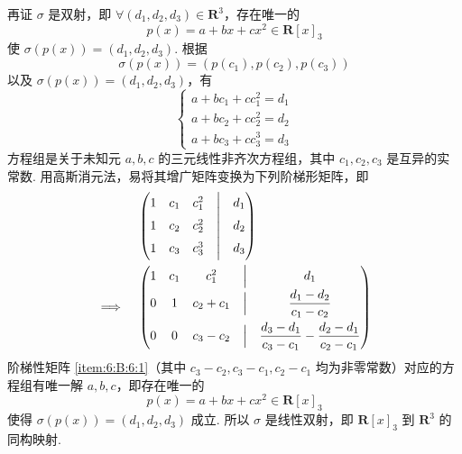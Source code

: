 \begin{enumerate}
          再证 $ \sigma $ 是双射，即 $ \forall (d_1, d_2, d_3) \in \mathbf{R}^3 $，存在唯一的
          \[ p(x) = a + bx + cx^2 \in \mathbf{R}[x]_3 \]
          使 $ \sigma(p(x)) = (d_1, d_2, d_3) $. 根据
          \[ \sigma(p(x)) = (p(c_1), p(c_2), p(c_3)) \]
          以及 $ \sigma(p(x)) = (d_1, d_2, d_3) $，有
          \[ \begin{cases}
                  a + bc_1 + cc_1^2 = d_1 \\
                  a + bc_2 + cc_2^2 = d_2 \\
                  a + bc_3 + cc_3^3 = d_3
              \end{cases} \]
          方程组是关于未知元 $ a, b, c $ 的三元线性非齐次方程组，其中 $ c_1, c_2, c_3 $ 是互异的实常数. 用高斯消元法，易将其增广矩阵变换为下列阶梯形矩阵，即
          \begin{align} %
                             & \begin{pmatrix}
                                   1 & c_1 & c_1^2 & \Bigm| & d_1 \\
                                   1 & c_2 & c_2^2 & \Bigm| & d_2 \\
                                   1 & c_3 & c_3^3 & \Bigm| & d_3
                               \end{pmatrix} \notag                                                             \\
              \implies \quad & \begin{pmatrix}
                                   1 & c_1 & c_1^2     & \Bigm| & d_1                                                         \\[1ex]
                                   0 & 1   & c_2 + c_1 & \Bigm| & \dfrac{d_1 - d_2}{c_1 - c_2}                                \\[2ex]
                                   0 & 0   & c_3 - c_2 & \Bigm| & \dfrac{d_3 - d_1}{c_3 - c_1} - \dfrac{d_2 - d_1}{c_2 - c_1}
                               \end{pmatrix} \label{item:6:B:6:1}
          \end{align}
          阶梯性矩阵 \ref*{item:6:B:6:1}（其中 $ c_3 - c_2, c_3 - c_1, c_2 - c_1 $ 均为非零常数）对应的方程组有唯一解 $ a, b, c $，即存在唯一的
          \[ p(x) = a + bx + cx^2 \in \mathbf{R}[x]_3 \]
          使得 $ \sigma(p(x)) = (d_1, d_2, d_3) $ 成立. 所以 $ \sigma $ 是线性双射，即 $ \mathbf{R}[x]_3 $ 到 $ \mathbf{R}^3 $ 的同构映射.
\end{enumerate}

